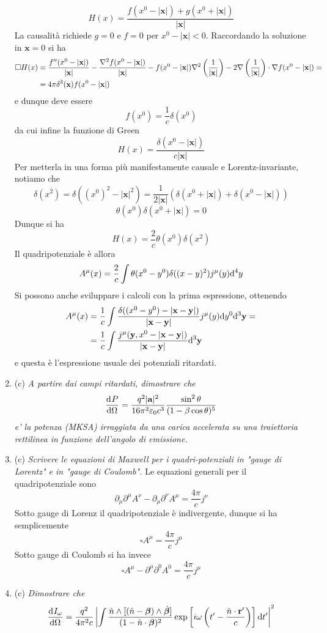 \documentclass{article}
\renewcommand{\c}{(c)}
\renewcommand{\t}[1]{\textit{ #1}}
\renewcommand{\vec}[1]{\mathbf{#1}}
\begin{document}
\begin{enumerate}
\[H(x)=\frac{f(x^0-|\vec{x}|)+g(x^0+|\vec{x}|)}{|\vec{x}|}\]
La causalità richiede $g=0$ e $f=0$ per $x^0-|\vec{x}|<0$. Raccordando la soluzione in $\vec{x}=0$ si ha
\begin{align*}\square H(x)&=\frac{f''(x^0-|\vec{x}|)}{|\vec{x}|}-\frac{\lap f(x^0-|\vec{x}|)}{|\vec{x}|}-f(x^0-|\vec{x}|)\lap\left(\frac{1}{|\vec{x}|}\right)-2\nabla\left(\frac{1}{|\vec{x}|}\right)\cdot\nabla f(x^0-|\vec{x}|)=\\&=4\pi\delta^3(\vec{x})f(x^0-|\vec{x}|)\end{align*}
e dunque deve essere
\[f(x^0)=\frac{1}{c}\delta(x^0)\]
da cui infine la funzione di Green
\[H(x)=\frac{\delta(x^0-|\vec{x}|)}{c|\vec{x}|}\]
Per metterla in una forma più manifestamente causale e Lorentz-invariante, notiamo che
\[\delta(x^2)=\delta((x^0)^2-|\vec{x}|^2)=\frac{1}{2|\vec{x}|}\left(\delta(x^0+|\vec{x}|)+\delta(x^0-|\vec{x}|)\right)\]
\[\theta(x^0)\delta(x^0+|\vec{x}|)=0\]
Dunque si ha
\[H(x)=\frac{2}{c}\theta(x^0)\delta(x^2)\]
Il quadripotenziale è allora
\[A^\mu(x)=\frac{2}{c}\int\theta(x^0-y^0)\delta((x-y)^2)j^\mu(y)\mathrm{d} ^4y\]
Si possono anche sviluppare i calcoli con la prima espressione, ottenendo
\begin{align*}A^\mu(x)&=\frac{1}{c}\int\frac{\delta((x^0-y^0)-|\vec{x}-\vec{y}|)}{|\vec{x}-\vec{y}|}j^\mu(y)\d y^0\d^3\vec{y}=\\&=\frac{1}{c}\int\frac{j^\mu(\vec{y},x^0-|\vec{x}-\vec{y}|)}{|\vec{x}-\vec{y}|}\d ^3\vec{y}\end{align*}
e questa è l'espressione usuale dei potenziali ritardati.
	\item\c\t{A partire dai campi ritardati, dimostrare che
		\[\der{P}{\Omega}=\frac{q^2|\vec{a}|^2}{16\pi^2\varepsilon_0c^3}\frac{\sin^2\theta}{(1-\beta\cos\theta)^5}\]
		e’ la potenza
		(MKSA) irraggiata da una carica accelerata su una traiettoria rettilinea in funzione
		dell’angolo di emissione.}
	\item\c\t{Scrivere le equazioni di Maxwell per i quadri-potenziali in "gauge di Lorentz" e in
		"gauge di Coulomb".}
		Le equazioni generali per il quadripotenziale sono
		\[\partial_\mu\partial^\mu A^\nu-\partial_\mu\partial^\nu A^\mu=\frac{4\pi}{c}j^\nu\]
		Sotto gauge di Lorenz il quadripotenziale è indivergente, dunque si ha semplicemente
		\[\square A^\mu=\frac{4\pi}{c}j^\mu\]
		Sotto gauge di Coulomb si ha invece
		\[\square A^\mu-\partial^\mu \partial^0A^0=\frac{4\pi}{c}j^\mu\]
	\item\c\t{Dimostrare che
		\[\der{I_\omega}{\Omega}=\frac{q^2}{4\pi^2c}\left|\int\frac{\hat{n}\wedge[(\hat{n}-\bm{\beta})\wedge\dot{\bm{\beta}}]}{(1-\hat{n}\cdot\bm{\beta})^2}\exp\left[i\omega\left(t'-\frac{\hat{n}\cdot\vec{r}'}{c}\right)\right]\d t'\right|^2\]
}
\end{enumerate}
\end{document}
